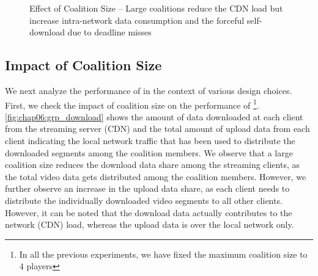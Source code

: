 \begin{figure}[!ht]
	\captionsetup[subfigure]{width=0.49\linewidth}
	\begin{center}
	\end{center}
\caption{\label{fig:chap06:grpsz}Effect of Coalition Size -- Large coalitions reduce the CDN load but increase intra-network data consumption and the forceful self-download due to deadline misses}
\end{figure}


\subsection{Impact of Coalition Size}
We next analyze the performance of {\our} in the context of various design choices. First, we check the impact of coalition size on the performance of {\our}\footnote{In all the previous experiments, we have fixed the maximum coalition size to $4$ players}. \fig\ref{fig:chap06:grp_download} shows the amount of data downloaded at each client from the streaming server (\acs{CDN}) and the total amount of upload data from each client indicating the local network traffic that has been used to distribute the downloaded segments among the coalition members. We observe that a large coalition size reduces the download data share among the streaming clients, as the total video data gets distributed among the coalition members. However, we further observe an increase in the upload data share, as each client needs to distribute the individually downloaded video segments to all other clients. However, it can be noted that the download data actually contributes to the network (\acs{CDN}) load, whereas the upload data is over the local network only.

